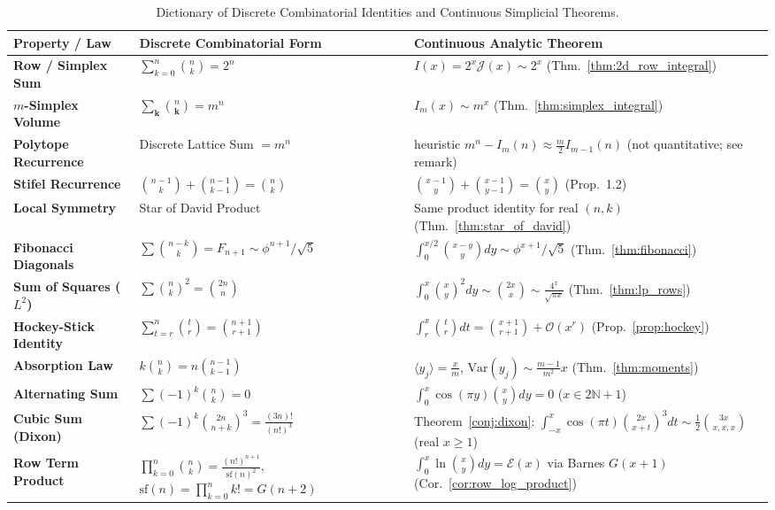 \documentclass[11pt,a4paper]{article}
\theoremstyle{plain}
\theoremstyle{definition}
\theoremstyle{remark}
\numberwithin{equation}{section}
\begin{document}
\begin{table}[htbp]
\centering
\small
\caption{Dictionary of Discrete Combinatorial Identities and Continuous Simplicial Theorems.}
\label{tab:dictionary}
\begin{tabularx}{\textwidth}{l>{\raggedright\arraybackslash}X>{\raggedright\arraybackslash}X}
\toprule
\textbf{Property / Law} & \textbf{Discrete Combinatorial Form} & \textbf{Continuous Analytic Theorem} \\
\midrule
\textbf{Row / Simplex Sum} & $\sum_{k=0}^n \binom{n}{k} = 2^n$ & $I(x) = 2^x \mathcal{J}(x) \sim 2^x$ (Thm.~\ref{thm:2d_row_integral}) \\
\textbf{$m$-Simplex Volume} & $\sum_{\mathbf{k}} \binom{n}{\mathbf{k}} = m^n$ & $I_m(x) \sim m^x$ (Thm.~\ref{thm:simplex_integral}) \\
\textbf{Polytope Recurrence} & Discrete Lattice Sum $= m^n$ & heuristic $m^n - I_m(n) \approx \frac{m}{2}I_{m-1}(n)$ (not quantitative; see remark) \\
\textbf{Stifel Recurrence} & $\binom{n-1}{k} + \binom{n-1}{k-1} = \binom{n}{k}$ & $\binom{x-1}{y} + \binom{x-1}{y-1} = \binom{x}{y}$ (Prop.~1.2) \\
\textbf{Local Symmetry} & Star of David Product \cite{hoggatt1971} & Same product identity for real $(n,k)$ (Thm.~\ref{thm:star_of_david}) \\
\textbf{Fibonacci Diagonals} & $\sum \binom{n-k}{k} = F_{n+1} \sim \phi^{n+1}/\sqrt{5}$ & $\int_0^{x/2} \binom{x-y}{y}dy \sim \phi^{x+1}/\sqrt{5}$ (Thm.~\ref{thm:fibonacci}) \\
\textbf{Sum of Squares ($L^2$)} & $\sum \binom{n}{k}^2 = \binom{2n}{n}$ & $\int_0^x \binom{x}{y}^2 dy \sim \binom{2x}{x} \sim \frac{4^x}{\sqrt{\pi x}}$ (Thm.~\ref{thm:lp_rows}) \\
\textbf{Hockey-Stick Identity} & $\sum_{t=r}^n \binom{t}{r} = \binom{n+1}{r+1}$ & $\int_r^x \binom{t}{r}dt = \binom{x+1}{r+1} + \mathcal{O}(x^r)$ (Prop.~\ref{prop:hockey}) \\
\textbf{Absorption Law} & $k\binom{n}{k} = n\binom{n-1}{k-1}$ & $\langle y_j \rangle = \frac{x}{m}$, $\mathrm{Var}(y_j) \sim \frac{m-1}{m^2}x$ (Thm.~\ref{thm:moments}) \\
\textbf{Alternating Sum} & $\sum (-1)^k \binom{n}{k} = 0$ & $\int_0^x \cos(\pi y)\binom{x}{y}dy = 0$ ($x \in 2\mathbb{N}+1$) \\
\textbf{Cubic Sum (Dixon)} & $\sum (-1)^k \binom{2n}{n+k}^3 = \frac{(3n)!}{(n!)^3}$ \cite{dixon1891} & Theorem~\ref{conj:dixon}: $\int_{-x}^x \cos(\pi t)\binom{2x}{x+t}^3 dt \sim \frac{1}{2}\binom{3x}{x,x,x}$ (real $x\ge1$) \\
\textbf{Row Term Product} & $\prod_{k=0}^n \binom{n}{k} = \frac{(n!)^{n+1}}{\mathrm{sf}(n)^2}$, $\mathrm{sf}(n) = \prod_{k=0}^n k! = G(n+2)$ & $\int_0^x \ln\binom{x}{y}dy = \mathcal{E}(x)$ via Barnes $G(x+1)$ (Cor.~\ref{cor:row_log_product}) \\
\bottomrule
\end{tabularx}
\end{table}
\end{document}
